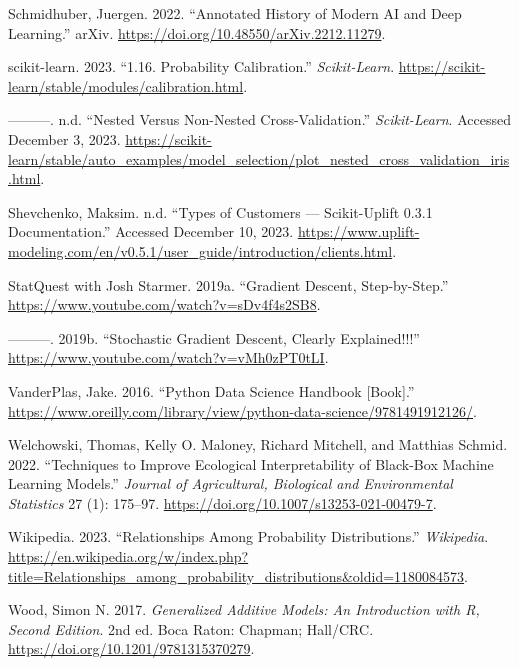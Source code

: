 \documentclass[
  letterpaper,
]{krantz}
\newlength{\cslhangindent}
\newenvironment{CSLReferences}[2] %
 {\begin{list}{}{%
  \setlength{\itemindent}{0pt}
  \setlength{\leftmargin}{0pt}
  \setlength{\parsep}{0pt}
  \ifodd #1
   \setlength{\leftmargin}{\cslhangindent}
   \setlength{\itemindent}{-1\cslhangindent}
  \fi
  \setlength{\itemsep}{#2\baselineskip}}}
 {\end{list}}
\begin{document}
\begin{CSLReferences}{1}{0}
Schmidhuber, Juergen. 2022. {``Annotated {History} of {Modern} {AI} and
{Deep} {Learning}.''} arXiv.
\url{https://doi.org/10.48550/arXiv.2212.11279}.

scikit-learn. 2023. {``1.16. {Probability} Calibration.''}
\emph{Scikit-Learn}.
\url{https://scikit-learn/stable/modules/calibration.html}.

---------. n.d. {``Nested Versus Non-Nested Cross-Validation.''}
\emph{Scikit-Learn}. Accessed December 3, 2023.
\url{https://scikit-learn/stable/auto_examples/model_selection/plot_nested_cross_validation_iris.html}.

Shevchenko, Maksim. n.d. {``Types of Customers --- Scikit-Uplift 0.3.1
Documentation.''} Accessed December 10, 2023.
\url{https://www.uplift-modeling.com/en/v0.5.1/user_guide/introduction/clients.html}.

StatQuest with Josh Starmer. 2019a. {``Gradient {Descent},
{Step}-by-{Step}.''} \url{https://www.youtube.com/watch?v=sDv4f4s2SB8}.

---------. 2019b. {``Stochastic {Gradient} {Descent}, {Clearly}
{Explained}!!!''} \url{https://www.youtube.com/watch?v=vMh0zPT0tLI}.

VanderPlas, Jake. 2016. {``Python {Data} {Science} {Handbook}
{[}{Book}{]}.''}
\url{https://www.oreilly.com/library/view/python-data-science/9781491912126/}.

Welchowski, Thomas, Kelly O. Maloney, Richard Mitchell, and Matthias
Schmid. 2022. {``Techniques to {Improve} {Ecological} {Interpretability}
of {Black}-{Box} {Machine} {Learning} {Models}.''} \emph{Journal of
Agricultural, Biological and Environmental Statistics} 27 (1): 175--97.
\url{https://doi.org/10.1007/s13253-021-00479-7}.

Wikipedia. 2023. {``Relationships Among Probability Distributions.''}
\emph{Wikipedia}.
\url{https://en.wikipedia.org/w/index.php?title=Relationships_among_probability_distributions&oldid=1180084573}.

Wood, Simon N. 2017. \emph{Generalized {Additive} {Models}: {An}
{Introduction} with {R}, {Second} {Edition}}. 2nd ed. Boca Raton:
Chapman; Hall/CRC. \url{https://doi.org/10.1201/9781315370279}.


\end{CSLReferences}
\end{document}
